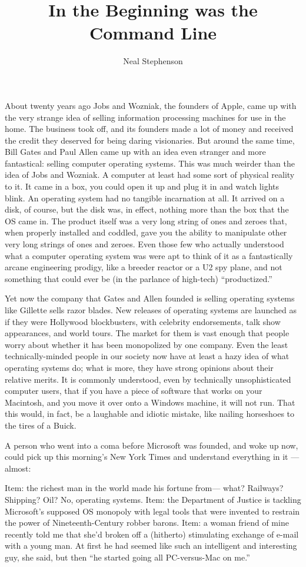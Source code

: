 \documentclass[
  fontsize=11pt,
  paper=landscape,
  twocolumn=true,
  pagesize=pdftex,
  headings=small,
  DIV=15,
  ]{scrartcl}
\title{In the Beginning was the Command Line}
\author{Neal Stephenson}
\begin{document}
\maketitle
About twenty years ago Jobs and Wozniak, the founders of Apple, came up
with the very strange idea of selling information processing machines
for use in the home. The business took off, and its founders made a lot
of money and received the credit they deserved for being daring
visionaries. But around the same time, Bill Gates and Paul Allen came up
with an idea even stranger and more fantastical: selling computer
operating systems. This was much weirder than the idea of Jobs and
Wozniak. A computer at least had some sort of physical reality to it. It
came in a box, you could open it up and plug it in and watch lights
blink. An operating system had no tangible incarnation at all. It
arrived on a disk, of course, but the disk was, in effect, nothing more
than the box that the OS came in. The product itself was a very long
string of ones and zeroes that, when properly installed and coddled,
gave you the ability to manipulate other very long strings of ones and
zeroes. Even those few who actually understood what a computer operating
system was were apt to think of it as a fantastically arcane engineering
prodigy, like a breeder reactor or a U2 spy plane, and not something
that could ever be (in the parlance of high-tech) ``productized.''

Yet now the company that Gates and Allen founded is selling operating
systems like Gillette sells razor blades. New releases of operating
systems are launched as if they were Hollywood blockbusters, with
celebrity endorsements, talk show appearances, and world tours. The
market for them is vast enough that people worry about whether it has
been monopolized by one company. Even the least technically-minded
people in our society now have at least a hazy idea of what operating
systems do; what is more, they have strong opinions about their relative
merits. It is commonly understood, even by technically unsophisticated
computer users, that if you have a piece of software that works on your
Macintosh, and you move it over onto a Windows machine, it will not run.
That this would, in fact, be a laughable and idiotic mistake, like
nailing horseshoes to the tires of a Buick.

A person who went into a coma before Microsoft was founded, and woke up
now, could pick up this morning's New York Times and understand
everything in it --- almost:

Item: the richest man in the world made his fortune from--- what?
Railways? Shipping? Oil? No, operating systems. Item: the Department of
Justice is tackling Microsoft's supposed OS monopoly with legal tools
that were invented to restrain the power of Nineteenth-Century robber
barons. Item: a woman friend of mine recently told me that she'd broken
off a (hitherto) stimulating exchange of e-mail with a young man. At
first he had seemed like such an intelligent and interesting guy, she
said, but then ``he started going all PC-versus-Mac on me.''
\end{document}
